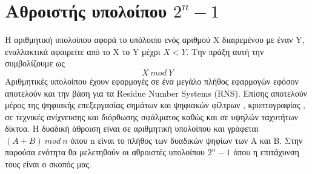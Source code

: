 \section{Αθροιστής υπολοίπου $2^n-1$}
Η αριθμητική υπολοίπου αφορά το υπόλοιπο ενός αριθμού X διαιρεμένου με έναν Y, εναλλακτικά
αφαιρείτε από το Χ το Y μέχρι $X < Y$. Την πράξη αυτή την συμβολίζουμε ως 
\begin{equation*}
    X\ mod\ Y
\end{equation*}
Αριθμητικές υπολοίπου έχουν εφαρμογές σε ένα μεγάλο πλήθος εφαρμογών εφόσον αποτελούν και 
την βάση για τα Residue Number Systems (RNS). Επίσης αποτελούν μέρος της ψηφιακής
επεξεργασίας σημάτων και ψηφιακών φίλτρων , κρυπτογραφίας , σε τεχνικές ανίχνευσης και διόρθωσης σφάλματος καθώς και σε υψηλών ταχυτήτων δίκτυα. Η δυαδική άθροιση είναι σε 
αριθμητική υπολοίπου και γράφεται $(A+B)\ mod\ n$ όπου n είναι το πλήθος των δυαδικών 
ψηφίων των A και B. 
Στην παρούσα ενότητα θα μελετηθούν οι αθροιστές υπολοίπου $2^n-1$ όπου η επιτάχυνση τους είναι ο σκοπός μας.






